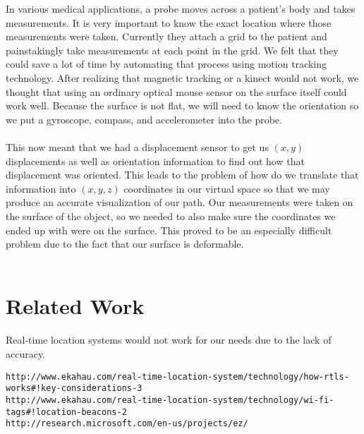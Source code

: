 \documentclass[conference]{acmsiggraph}
\begin{document}
In various medical applications, a probe moves across a patient's body and takes measurements. It is very important to know the exact location where those measurements were taken. Currently they attach a grid to the patient and painstakingly take measurements at each point in the grid. We felt that they could save a lot of time by automating that process using motion tracking technology. After realizing that magnetic tracking or a kinect would not work, we thought that using an ordinary optical mouse sensor on the surface itself could work well. Because the surface is not flat, we will need to know the orientation so we put a gyroscope, compass, and accelerometer into the probe. \\
\\
This now meant that we had a displacement sensor to get us $(x,y)$ displacements as well as orientation information to find out how that displacement was oriented. This leads to the problem of how do we translate that information into $(x,y,z)$ coordinates in our virtual space so that we may produce an accurate visualization of our path. Our measurements were taken on the surface of the object, so we needed to also make sure the coordinates we ended up with were on the surface. This proved to be an especially difficult problem due to the fact that our surface is deformable. \\
\\


\section{Related Work}

Real-time location systems would not work for our needs due to the lack of accuracy. 
\begin{verbatim}
http://www.ekahau.com/real-time-location-system/technology/how-rtls-works#!key-considerations-3
http://www.ekahau.com/real-time-location-system/technology/wi-fi-tags#!location-beacons-2
http://research.microsoft.com/en-us/projects/ez/
\end{verbatim}
\end{document}

